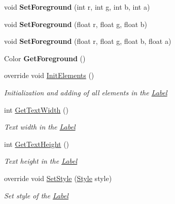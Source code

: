 \begin{DoxyCompactItemize}
\mbox{\label{class_space_v_i_l_1_1_label_aa1b7740b3ec88243557afeed8cdc8e77}} 
void {\bfseries Set\+Foreground} (int r, int g, int b, int a)
\item 
\mbox{\label{class_space_v_i_l_1_1_label_a362daa577d29d00ef7354a3d46300aab}} 
void {\bfseries Set\+Foreground} (float r, float g, float b)
\item 
\mbox{\label{class_space_v_i_l_1_1_label_a5dcf0b0f5fad75f4f7e978f37d044a0c}} 
void {\bfseries Set\+Foreground} (float r, float g, float b, float a)
\item 
\mbox{\label{class_space_v_i_l_1_1_label_a317a05e27808c542e4c48de32108078f}} 
Color {\bfseries Get\+Foreground} ()
\item 
override void \mbox{\hyperlink{class_space_v_i_l_1_1_label_a2bdc7da304e91a50a820b8c8f722c0be}{Init\+Elements}} ()
\begin{DoxyCompactList}\small\item\em Initialization and adding of all elements in the \mbox{\hyperlink{class_space_v_i_l_1_1_label}{Label}} \end{DoxyCompactList}\item 
int \mbox{\hyperlink{class_space_v_i_l_1_1_label_a679b77d3cf9beaa4b470782b40e91cca}{Get\+Text\+Width}} ()
\begin{DoxyCompactList}\small\item\em Text width in the \mbox{\hyperlink{class_space_v_i_l_1_1_label}{Label}} \end{DoxyCompactList}\item 
int \mbox{\hyperlink{class_space_v_i_l_1_1_label_a1428755f295e8cfd6b553b6d871615eb}{Get\+Text\+Height}} ()
\begin{DoxyCompactList}\small\item\em Text height in the \mbox{\hyperlink{class_space_v_i_l_1_1_label}{Label}} \end{DoxyCompactList}\item 
override void \mbox{\hyperlink{class_space_v_i_l_1_1_label_ae98bd34b1931300d5a6c908f80260ad8}{Set\+Style}} (\mbox{\hyperlink{class_space_v_i_l_1_1_decorations_1_1_style}{Style}} style)
\begin{DoxyCompactList}\small\item\em Set style of the \mbox{\hyperlink{class_space_v_i_l_1_1_label}{Label}} \end{DoxyCompactList}\end{DoxyCompactItemize}
